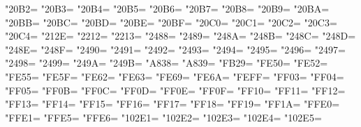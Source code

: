 \XeTeXcharclass"20B2=\KclassNum
\XeTeXcharclass"20B3=\KclassNum
\XeTeXcharclass"20B4=\KclassNum
\XeTeXcharclass"20B5=\KclassNum
\XeTeXcharclass"20B6=\KclassNum
\XeTeXcharclass"20B7=\KclassNum
\XeTeXcharclass"20B8=\KclassNum
\XeTeXcharclass"20B9=\KclassNum
\XeTeXcharclass"20BA=\KclassNum
\XeTeXcharclass"20BB=\KclassNum
\XeTeXcharclass"20BC=\KclassNum
\XeTeXcharclass"20BD=\KclassNum
\XeTeXcharclass"20BE=\KclassNum
\XeTeXcharclass"20BF=\KclassNum
\XeTeXcharclass"20C0=\KclassNum
\XeTeXcharclass"20C1=\KclassNum
\XeTeXcharclass"20C2=\KclassNum
\XeTeXcharclass"20C3=\KclassNum
\XeTeXcharclass"20C4=\KclassNum
\XeTeXcharclass"212E=\KclassNum
\XeTeXcharclass"2212=\KclassNum
\XeTeXcharclass"2213=\KclassNum
\XeTeXcharclass"2488=\KclassNum
\XeTeXcharclass"2489=\KclassNum
\XeTeXcharclass"248A=\KclassNum
\XeTeXcharclass"248B=\KclassNum
\XeTeXcharclass"248C=\KclassNum
\XeTeXcharclass"248D=\KclassNum
\XeTeXcharclass"248E=\KclassNum
\XeTeXcharclass"248F=\KclassNum
\XeTeXcharclass"2490=\KclassNum
\XeTeXcharclass"2491=\KclassNum
\XeTeXcharclass"2492=\KclassNum
\XeTeXcharclass"2493=\KclassNum
\XeTeXcharclass"2494=\KclassNum
\XeTeXcharclass"2495=\KclassNum
\XeTeXcharclass"2496=\KclassNum
\XeTeXcharclass"2497=\KclassNum
\XeTeXcharclass"2498=\KclassNum
\XeTeXcharclass"2499=\KclassNum
\XeTeXcharclass"249A=\KclassNum
\XeTeXcharclass"249B=\KclassNum
\XeTeXcharclass"A838=\KclassNum
\XeTeXcharclass"A839=\KclassNum
\XeTeXcharclass"FB29=\KclassNum
\XeTeXcharclass"FE50=\KclassNum
\XeTeXcharclass"FE52=\KclassNum
\XeTeXcharclass"FE55=\KclassNum
\XeTeXcharclass"FE5F=\KclassNum
\XeTeXcharclass"FE62=\KclassNum
\XeTeXcharclass"FE63=\KclassNum
\XeTeXcharclass"FE69=\KclassNum
\XeTeXcharclass"FE6A=\KclassNum
\XeTeXcharclass"FEFF=\KclassNum
\XeTeXcharclass"FF03=\KclassNum
\XeTeXcharclass"FF04=\KclassNum
\XeTeXcharclass"FF05=\KclassNum
\XeTeXcharclass"FF0B=\KclassNum
\XeTeXcharclass"FF0C=\KclassNum
\XeTeXcharclass"FF0D=\KclassNum
\XeTeXcharclass"FF0E=\KclassNum
\XeTeXcharclass"FF0F=\KclassNum
\XeTeXcharclass"FF10=\KclassNum
\XeTeXcharclass"FF11=\KclassNum
\XeTeXcharclass"FF12=\KclassNum
\XeTeXcharclass"FF13=\KclassNum
\XeTeXcharclass"FF14=\KclassNum
\XeTeXcharclass"FF15=\KclassNum
\XeTeXcharclass"FF16=\KclassNum
\XeTeXcharclass"FF17=\KclassNum
\XeTeXcharclass"FF18=\KclassNum
\XeTeXcharclass"FF19=\KclassNum
\XeTeXcharclass"FF1A=\KclassNum
\XeTeXcharclass"FFE0=\KclassNum
\XeTeXcharclass"FFE1=\KclassNum
\XeTeXcharclass"FFE5=\KclassNum
\XeTeXcharclass"FFE6=\KclassNum
\XeTeXcharclass"102E1=\KclassNum
\XeTeXcharclass"102E2=\KclassNum
\XeTeXcharclass"102E3=\KclassNum
\XeTeXcharclass"102E4=\KclassNum
\XeTeXcharclass"102E5=\KclassNum
